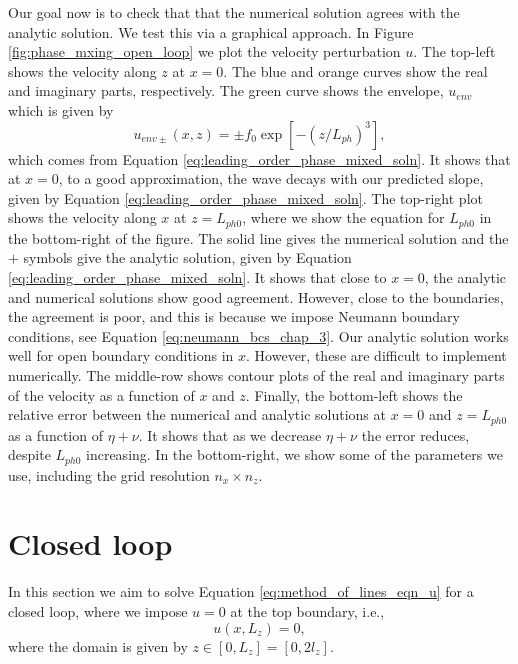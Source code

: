 Our goal now is to check that that the numerical solution agrees with the analytic solution. We test this via a graphical approach. In Figure \ref{fig:phase_mxing_open_loop} we plot the velocity perturbation $u$. The top-left shows the velocity along $z$ at $x=0$. The blue and orange curves show the real and imaginary parts, respectively. The green curve shows the envelope, $u_{env}$ which is given by
\begin{equation}
    \label{eq:velocity_envelope}
    u_{env\pm}(x,z) = \pm f_0\exp[-(z/L_{ph})^3],
\end{equation}
which comes from Equation \eqref{eq:leading_order_phase_mixed_soln}. It shows that at $x=0$, to a good approximation, the wave decays with our predicted slope, given by Equation \eqref{eq:leading_order_phase_mixed_soln}. The top-right plot shows the velocity along $x$ at $z=L_{ph0}$, where we show the equation for $L_{ph0}$ in the bottom-right of the figure. The solid line gives the numerical solution and the $+$ symbols give the analytic solution, given by Equation \eqref{eq:leading_order_phase_mixed_soln}. It shows that close to $x=0$, the analytic and numerical solutions show good agreement. However, close to the boundaries, the agreement is poor, and this is because we impose Neumann boundary conditions, see Equation \eqref{eq:neumann_bcs_chap_3}. Our analytic solution works well for open boundary conditions in $x$. However, these are difficult to implement numerically. The middle-row shows contour plots of the real and imaginary parts of the velocity as a function of $x$ and $z$. Finally, the bottom-left shows the relative error between the numerical and analytic solutions at $x=0$ and $z=L_{ph0}$ as a function of $\eta+\nu$. It shows that as we decrease $\eta+\nu$ the error reduces, despite $L_{ph0}$ increasing. In the bottom-right, we show some of the parameters we use, including the grid resolution $n_x\times n_z$.

\section{Closed loop}
\label{sec:chap_3_closed_loop}

In this section we aim to solve Equation \eqref{eq:method_of_lines_eqn_u} for a closed loop, where we impose $u=0$ at the top boundary, i.e.,
\begin{equation}
    u(x,L_z)=0,
\end{equation}
where the domain is given by $z\in[0,L_z]=[0,2l_z]$.

